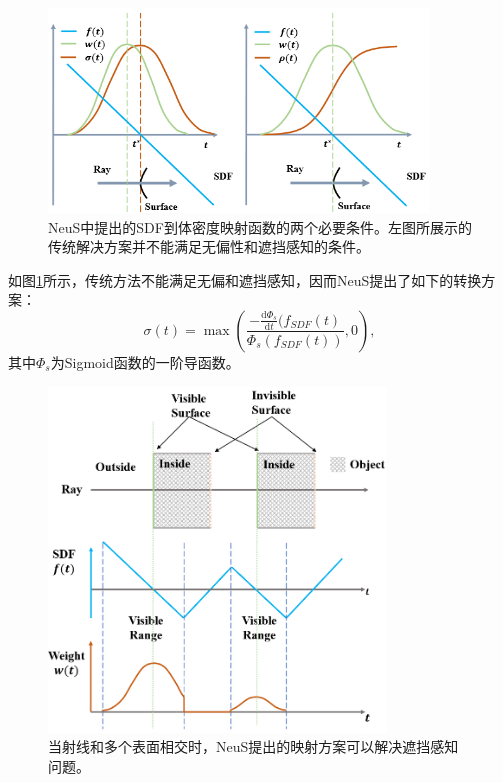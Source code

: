 \begin{figure}[ht]
    \centering
    \includegraphics[width=0.9\textwidth]{undergraduate-thesis/images/neus conditions.png}
    \caption{NeuS\cite{wang_neus_2021}中提出的SDF到体密度映射函数的两个必要条件。左图所展示的传统解决方案并不能满足无偏性和遮挡感知的条件。}
    \label{fig: related-work neus conditions}
\end{figure}

如图\ref{fig: related-work neus conditions}所示，传统方法不能满足无偏和遮挡感知，因而NeuS提出了如下的转换方案：
\begin{equation}
    \sigma(t) = \max\left(\frac{-\frac{\text{d}\Phi_s}{\text{d}t}(f_{SDF}(t)}{\Phi_s(f_{SDF}(t))}, 0\right),
    \label{eq: related-work neus function}
\end{equation}
其中$\Phi_s$为Sigmoid函数的一阶导函数。

\begin{figure}[ht]
    \centering
    \includegraphics[width=0.8\textwidth]{undergraduate-thesis/images/neus multiple-surfaces.png}
    \caption{当射线和多个表面相交时，NeuS\cite{wang_neus_2021}提出的映射方案可以解决遮挡感知问题。}
    \label{fig:related-work occlusion-aware}
\end{figure}

